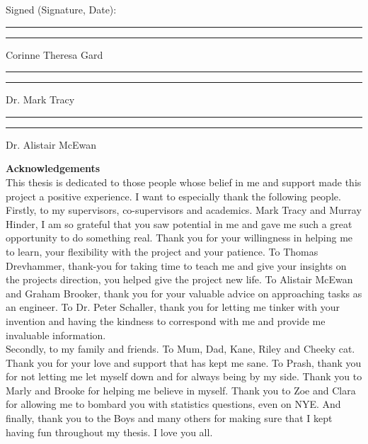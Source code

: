 \documentclass[12pt, openany, oneside]{book}
\begin{document}
\vspace{1cm}

Signed (Signature, Date):


\begin{center}
\vspace{1cm}
\rule[0.5em]{18em}{0.5pt}
\hfill
\rule[0.5em]{18em}{0.5pt}
Corinne Theresa Gard
\end{center}

\begin{center}
\vspace{1cm}
\rule[0.5em]{18em}{0.5pt}
\hfill
\rule[0.5em]{18em}{0.5pt}
Dr. Mark Tracy
\end{center}


\begin{center}
\vspace{1cm}
\rule[0.5em]{18em}{0.5pt}
\hfill
\rule[0.5em]{18em}{0.5pt}
Dr. Alistair McEwan
\end{center}





\clearpage
{\Large \bfseries Acknowledgements}\\

This thesis is dedicated to those people whose belief in me and support made this project a positive experience. I want to especially thank the following people.\\

Firstly, to my supervisors, co-supervisors and academics. Mark Tracy and Murray Hinder, I am so grateful that you saw potential in me and gave me such a great opportunity to do something real. Thank you for your willingness in helping me to learn, your flexibility with the project and your patience. To Thomas Drevhammer, thank-you for taking time to teach me and give your insights on the projects direction, you helped give the project new life. To Alistair McEwan and Graham Brooker, thank you for your valuable advice on approaching tasks as an engineer. To Dr. Peter Schaller, thank you for letting me tinker with your invention and having the kindness to correspond with me and provide me invaluable information. \\

Secondly, to my family and friends. To Mum, Dad, Kane, Riley and Cheeky cat. Thank you for your love and support that has kept me sane. To Prash, thank you for not letting me let myself down and for always being by my side. Thank you to Marly and Brooke for helping me believe in myself. Thank you to Zoe and Clara for allowing me to bombard you with statistics questions, even on NYE. And finally, thank you to the Boys and many others for making sure that I kept having fun throughout my thesis. I love you all.\\
\end{document}
